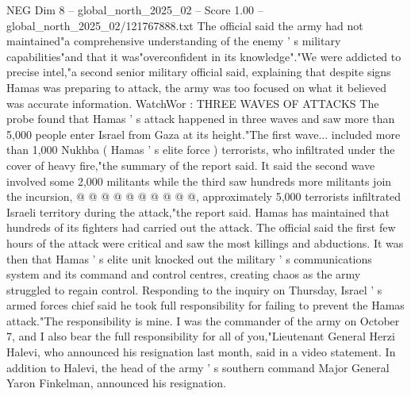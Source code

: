 \begin{textsample}{NEG Dim 8 – global\_north\_2025\_02 – Score 1.00 – global\_north\_2025\_02/121767888.txt}
The official said the army had not maintained"a comprehensive understanding of the enemy ' s military capabilities"and that it was"overconfident in its knowledge"."We were addicted to precise intel,"a second senior military official said, explaining that despite signs Hamas was preparing to attack, the army was too focused on what it believed was accurate information.
WatchWor : THREE WAVES OF ATTACKS The probe found that Hamas ' s attack happened in three waves and saw more than 5,000 people enter Israel from Gaza at its height."The first wave... included more than 1,000 Nukhba ( Hamas ' s elite force ) terrorists, who infiltrated under the cover of heavy fire,"the summary of the report said.
It said the second wave involved some 2,000 militants while the third saw hundreds more militants join the incursion, @ @ @ @ @ @ @ @ @ @, approximately 5,000 terrorists infiltrated Israeli territory during the attack,"the report said.
Hamas has maintained that hundreds of its fighters had carried out the attack.
The official said the first few hours of the attack were critical and saw the most killings and abductions.
It was then that Hamas ' s elite unit knocked out the military ' s communications system and its command and control centres, creating chaos as the army struggled to regain control.
Responding to the inquiry on Thursday, Israel ' s armed forces chief said he took full responsibility for failing to prevent the Hamas attack."The responsibility is mine.
I was the commander of the army on October 7, and I also bear the full responsibility for all of you,"Lieutenant General Herzi Halevi, who announced his resignation last month, said in a video statement.
In addition to Halevi, the head of the army ' s southern command Major General Yaron Finkelman, announced his resignation.

\end{textsample}
